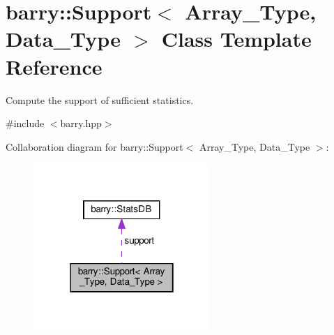 \hypertarget{classbarry_1_1_support}{}\section{barry\+:\+:Support$<$ Array\+\_\+\+Type, Data\+\_\+\+Type $>$ Class Template Reference}
\label{classbarry_1_1_support}


Compute the support of sufficient statistics.  




{\ttfamily \#include $<$barry.\+hpp$>$}



Collaboration diagram for barry\+:\+:Support$<$ Array\+\_\+\+Type, Data\+\_\+\+Type $>$\+:\nopagebreak
\begin{figure}[H]
\begin{center}
\leavevmode
\includegraphics[width=190pt]{classbarry_1_1_support__coll__graph}
\end{center}
\end{figure}
